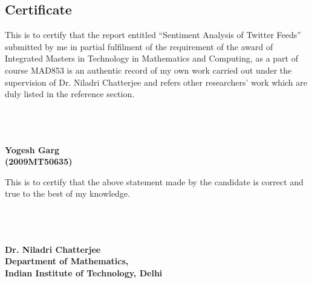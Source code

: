 \begin{center}
	\section*{Certificate}
\end{center}

This is to certify that the report entitled ``Sentiment Analysis of Twitter Feeds'' submitted by me
	in partial fulfilment of the requirement of the award of Integrated Masters in Technology in Mathematics and Computing,
	as a part of course MAD853 is an authentic record of my own work carried out under the supervision of Dr. Niladri Chatterjee and
	refers other researchers' work which are duly listed in the reference section.\\
\\
\\
\\
\begin{flushright}\textbf{
Yogesh Garg\\
(2009MT50635)}
\end{flushright}
\vspace{100pt}

This is to certify that the above statement made by the candidate is correct and true to the best of my knowledge.\\
\\
\\
\\
\begin{flushright}\textbf{
Dr. Niladri Chatterjee\\
Department of Mathematics,\\
Indian Institute of Technology, Delhi\\}
\end{flushright}
\vspace{100pt}